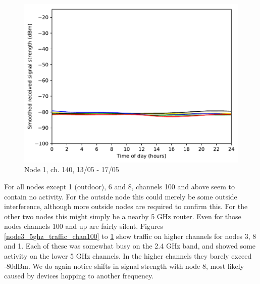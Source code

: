\documentclass[a4paper, 11pt]{article}
\begin{document}
\begin{figure}[ht]
\begin{minipage}{0.47\textwidth}
\centering
\includegraphics[width=\textwidth]{images/5_GHz/node1_2017-05-17_chan140_image.pdf}
\caption{Node 1, ch. 140, 13/05 - 17/05}
\label{node1_5ghz_traffic_chan140}
\end{minipage}\hfill
\end{figure}
For all nodes except 1 (outdoor), 6 and 8, channels 100 and above seem to contain no activity. For the outside node this could merely be some outside interference, although more outside nodes are required to confirm this. For the other two nodes this might simply be a nearby 5 GHz router. Even for those nodes channels 100 and up are fairly silent.
Figures \ref{node3_5ghz_traffic_chan100} to \ref{node1_5ghz_traffic_chan140} show traffic on higher channels for nodes 3, 8 and 1. Each of these was somewhat busy on the 2.4 GHz band, and showed some activity on the lower 5 GHz channels. In the higher channels they barely exceed -80dBm. We do again notice shifts in signal strength with node 8, most likely caused by devices hopping to another frequency.
\end{document}
